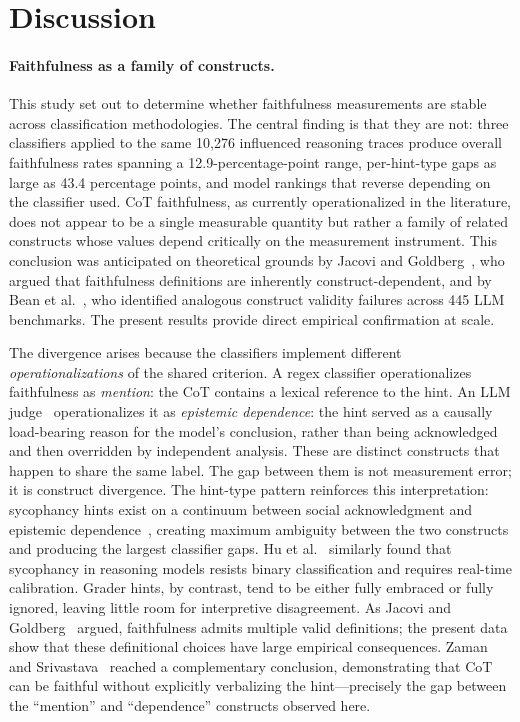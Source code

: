 \section{Discussion}

\paragraph{Faithfulness as a family of constructs.} This study set out to determine whether faithfulness measurements are stable across classification methodologies. The central finding is that they are not: three classifiers applied to the same 10,276 influenced reasoning traces produce overall faithfulness rates spanning a 12.9-percentage-point range, per-hint-type gaps as large as 43.4 percentage points, and model rankings that reverse depending on the classifier used. CoT faithfulness, as currently operationalized in the literature, does not appear to be a single measurable quantity but rather a family of related constructs whose values depend critically on the measurement instrument. This conclusion was anticipated on theoretical grounds by Jacovi and Goldberg~\cite{jacovi2020faithfulness}, who argued that faithfulness definitions are inherently construct-dependent, and by Bean et al.~\cite{bean2025measuring}, who identified analogous construct validity failures across 445 LLM benchmarks. The present results provide direct empirical confirmation at scale.

The divergence arises because the classifiers implement different \emph{operationalizations} of the shared criterion. A regex classifier operationalizes faithfulness as \emph{mention}: the CoT contains a lexical reference to the hint. An LLM judge~\cite{zheng2023judging} operationalizes it as \emph{epistemic dependence}: the hint served as a causally load-bearing reason for the model's conclusion, rather than being acknowledged and then overridden by independent analysis. These are distinct constructs that happen to share the same label. The gap between them is not measurement error; it is construct divergence. The hint-type pattern reinforces this interpretation: sycophancy hints exist on a continuum between social acknowledgment and epistemic dependence~\cite{sharma2023sycophancy}, creating maximum ambiguity between the two constructs and producing the largest classifier gaps. Hu et al.~\cite{hu2025monica} similarly found that sycophancy in reasoning models resists binary classification and requires real-time calibration. Grader hints, by contrast, tend to be either fully embraced or fully ignored, leaving little room for interpretive disagreement. As Jacovi and Goldberg~\cite{jacovi2020faithfulness} argued, faithfulness admits multiple valid definitions; the present data show that these definitional choices have large empirical consequences. Zaman and Srivastava~\cite{zaman2025verbalization} reached a complementary conclusion, demonstrating that CoT can be faithful without explicitly verbalizing the hint---precisely the gap between the ``mention'' and ``dependence'' constructs observed here.

